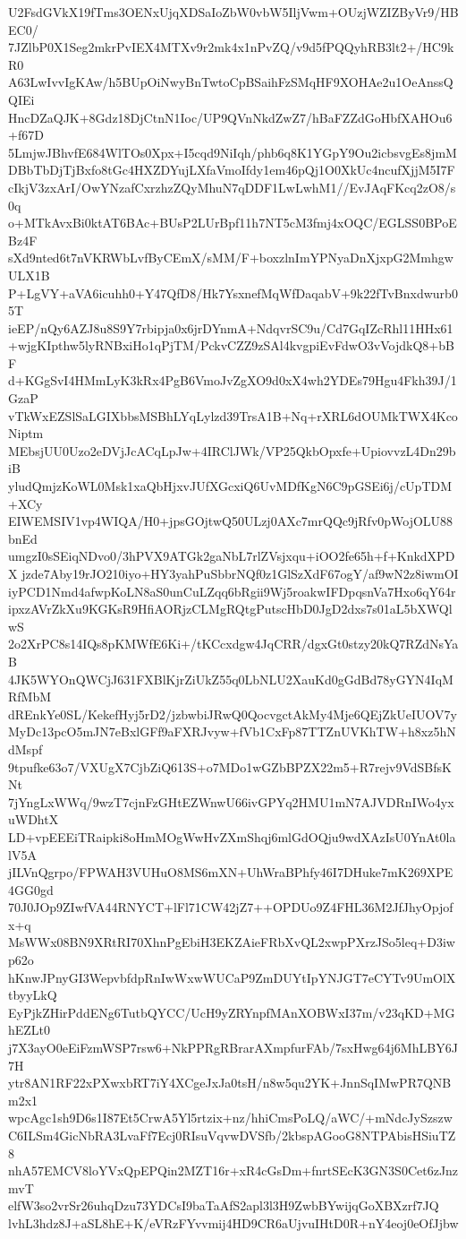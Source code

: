 U2FsdGVkX19fTms3OENxUjqXDSaIoZbW0vbW5IljVwm+OUzjWZIZByVr9/HBEC0/
7JZlbP0X1Seg2mkrPvIEX4MTXv9r2mk4x1nPvZQ/v9d5fPQQyhRB3lt2+/HC9kR0
A63LwIvvIgKAw/h5BUpOiNwyBnTwtoCpBSaihFzSMqHF9XOHAe2u1OeAnssQQIEi
HncDZaQJK+8Gdz18DjCtnN1Ioc/UP9QVnNkdZwZ7/hBaFZZdGoHbfXAHOu6+f67D
5LmjwJBhvfE684WlTOs0Xpx+I5cqd9NiIqh/phb6q8K1YGpY9Ou2icbsvgEs8jmM
DBbTbDjTjBxfo8tGc4HXZDYujLXfaVmoIfdy1em46pQj1O0XkUc4ncufXjjM5I7F
cIkjV3zxArI/OwYNzafCxrzhzZQyMhuN7qDDF1LwLwhM1//EvJAqFKcq2zO8/s0q
o+MTkAvxBi0ktAT6BAc+BUsP2LUrBpf11h7NT5cM3fmj4xOQC/EGLSS0BPoEBz4F
sXd9nted6t7nVKRWbLvfByCEmX/sMM/F+boxzlnImYPNyaDnXjxpG2MmhgwULX1B
P+LgVY+aVA6icuhh0+Y47QfD8/Hk7YsxnefMqWfDaqabV+9k22fTvBnxdwurb05T
ieEP/nQy6AZJ8u8S9Y7rbipja0x6jrDYnmA+NdqvrSC9u/Cd7GqIZcRhl11HHx61
+wjgKIpthw5lyRNBxiHo1qPjTM/PckvCZZ9zSAl4kvgpiEvFdwO3vVojdkQ8+bBF
d+KGgSvI4HMmLyK3kRx4PgB6VmoJvZgXO9d0xX4wh2YDEs79Hgu4Fkh39J/1GzaP
vTkWxEZSlSaLGIXbbsMSBhLYqLylzd39TrsA1B+Nq+rXRL6dOUMkTWX4KcoNiptm
MEbsjUU0Uzo2eDVjJcACqLpJw+4IRClJWk/VP25QkbOpxfe+UpiovvzL4Dn29biB
yludQmjzKoWL0Msk1xaQbHjxvJUfXGcxiQ6UvMDfKgN6C9pGSEi6j/cUpTDM+XCy
EIWEMSIV1vp4WIQA/H0+jpsGOjtwQ50ULzj0AXc7mrQQc9jRfv0pWojOLU88bnEd
umgzI0sSEiqNDvo0/3hPVX9ATGk2gaNbL7rlZVsjxqu+iOO2fe65h+f+KnkdXPDX
jzde7Aby19rJO210iyo+HY3yahPuSbbrNQf0z1GlSzXdF67ogY/af9wN2z8iwmOI
iyPCD1Nmd4afwpKoLN8aS0unCuLZqq6bRgii9Wj5roakwIFDpqsnVa7Hxo6qY64r
ipxzAVrZkXu9KGKsR9HfiAORjzCLMgRQtgPutscHbD0JgD2dxs7s01aL5bXWQlwS
2o2XrPC8s14IQs8pKMWfE6Ki+/tKCcxdgw4JqCRR/dgxGt0stzy20kQ7RZdNsYaB
4JK5WYOnQWCjJ631FXBlKjrZiUkZ55q0LbNLU2XauKd0gGdBd78yGYN4IqMRfMbM
dREnkYe0SL/KekefHyj5rD2/jzbwbiJRwQ0QocvgctAkMy4Mje6QEjZkUeIUOV7y
MyDc13pcO5mJN7eBxlGFf9aFXRJvyw+fVb1CxFp87TTZnUVKhTW+h8xz5hNdMspf
9tpufke63o7/VXUgX7CjbZiQ613S+o7MDo1wGZbBPZX22m5+R7rejv9VdSBfsKNt
7jYngLxWWq/9wzT7cjnFzGHtEZWnwU66ivGPYq2HMU1mN7AJVDRnIWo4yxuWDhtX
LD+vpEEEiTRaipki8oHmMOgWwHvZXmShqj6mlGdOQju9wdXAzIsU0YnAt0lalV5A
jILVnQgrpo/FPWAH3VUHuO8MS6mXN+UhWraBPhfy46I7DHuke7mK269XPE4GG0gd
70J0JOp9ZIwfVA44RNYCT+lFl71CW42jZ7++OPDUo9Z4FHL36M2JfJhyOpjofx+q
MsWWx08BN9XRtRI70XhnPgEbiH3EKZAieFRbXvQL2xwpPXrzJSo5leq+D3iwp62o
hKnwJPnyGI3WepvbfdpRnIwWxwWUCaP9ZmDUYtIpYNJGT7eCYTv9UmOlXtbyyLkQ
EyPjkZHirPddENg6TutbQYCC/UcH9yZRYnpfMAnXOBWxI37m/v23qKD+MGhEZLt0
j7X3ayO0eEiFzmWSP7rsw6+NkPPRgRBrarAXmpfurFAb/7sxHwg64j6MhLBY6J7H
ytr8AN1RF22xPXwxbRT7iY4XCgeJxJa0tsH/n8w5qu2YK+JnnSqIMwPR7QNBm2x1
wpcAgc1sh9D6s1I87Et5CrwA5Yl5rtzix+nz/hhiCmsPoLQ/aWC/+mNdcJySzszw
C6ILSm4GicNbRA3LvaFf7Ecj0RIsuVqvwDVSfb/2kbspAGooG8NTPAbisHSiuTZ8
nhA57EMCV8loYVxQpEPQin2MZT16r+xR4cGsDm+fnrtSEcK3GN3S0Cet6zJnzmvT
elfW3so2vrSr26uhqDzu73YDCsI9baTaAfS2apl3l3H9ZwbBYwijqGoXBXzrf7JQ
lvhL3hdz8J+aSL8hE+K/eVRzFYvvmij4HD9CR6aUjvuIHtD0R+nY4eoj0eOfJjbw
